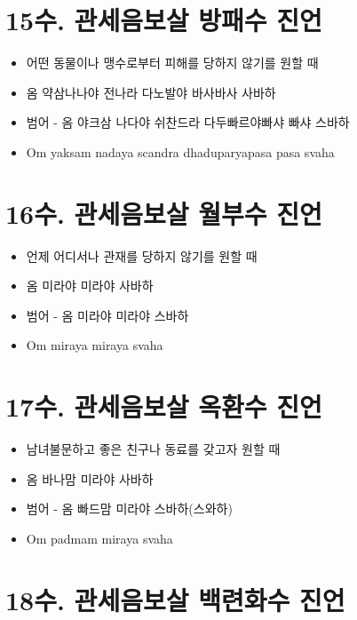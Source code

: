 \documentclass[12pt, a4paper, oneside]{book}
\let\stdsection\section
\renewcommand\section{\newpage\stdsection}
\begin{document}
\section{15수. 관세음보살 방패수 진언}

			\begin{itemize}
			\item 어떤 동물이나 맹수로부터 피해를 당하지 않기를 원할 때
			\item 옴 약삼나나야 전나라 다노발야 바사바사 사바하
			\item 범어 - 옴 야크삼 나다야 쉬찬드라 다두빠르야빠샤 빠샤 스바하
			\item Om yaksam nadaya scandra dhaduparyapasa pasa svaha
			\end{itemize}



 


\section{16수. 관세음보살 월부수 진언}

			\begin{itemize}
			\item 언제 어디서나 관재를 당하지 않기를 원할 때
			\item 옴 미라야 미라야 사바하
			\item 범어 - 옴 미라야 미라야 스바하
			\item Om miraya miraya svaha
			\end{itemize}





\section{17수. 관세음보살 옥환수 진언}

			\begin{itemize}
			\item 남녀불문하고 좋은 친구나 동료를 갖고자 원할 때
			\item 옴 바나맘 미라야 사바하
			\item 범어 - 옴 빠드맘 미라야 스바하(스와하)
			\item Om padmam miraya svaha
			\end{itemize}





\section{18수. 관세음보살 백련화수 진언}
\end{document}
